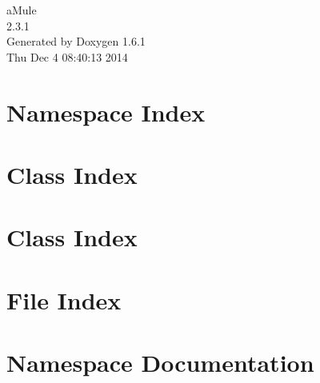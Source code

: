 \documentclass[a4paper]{book}
\begin{document}
\begin{titlepage}
\vspace*{7cm}
\begin{center}
{\Large aMule \\[1ex]\large 2.3.1 }\\
\vspace*{1cm}
{\large Generated by Doxygen 1.6.1}\\
\vspace*{0.5cm}
{\small Thu Dec 4 08:40:13 2014}\\
\end{center}
\end{titlepage}
\clearemptydoublepage
{}
\tableofcontents
\clearemptydoublepage
{}
\chapter{Namespace Index}

\chapter{Class Index}

\chapter{Class Index}

\chapter{File Index}

\chapter{Namespace Documentation}

\end{document}
